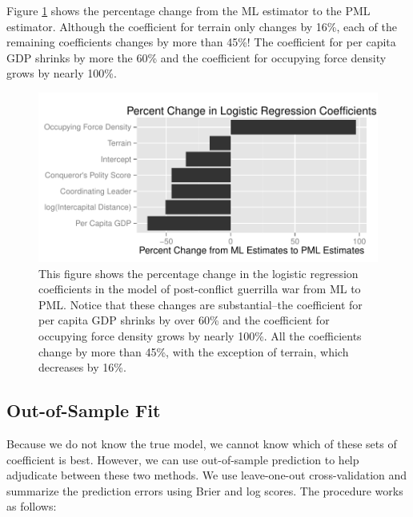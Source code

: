 \documentclass[12pt]{article}
\begin{document}
Figure \ref{fig:weisiger-perc-change} shows the percentage change from the ML estimator to the PML estimator. 
Although the coefficient for terrain only changes by 16\%, each of the remaining coefficients changes by more than 45\%! The coefficient for per capita GDP shrinks by more the 60\% and the coefficient for occupying force density grows by nearly 100\%.

\begin{figure}[H]
\begin{center}
\includegraphics[scale = 0.7]{figs/weisiger-perc-change.pdf}
\caption{This figure shows the percentage change in the logistic regression coefficients in the model of post-conflict guerrilla war from ML to PML. 
Notice that these changes are substantial--the coefficient for per capita GDP shrinks by over 60\% and the coefficient for occupying force density grows by nearly 100\%. 
All the coefficients change by more than 45\%, with the exception of terrain, which decreases by 16\%.}\label{fig:weisiger-perc-change}
\end{center}
\end{figure}

\subsection*{Out-of-Sample Fit}

Because we do not know the true model, we cannot know which of these sets of coefficient is best. However, we can use out-of-sample prediction to help adjudicate between these two methods. We use leave-one-out cross-validation and summarize the prediction errors using Brier and log scores. The procedure works as follows:
\end{document}
